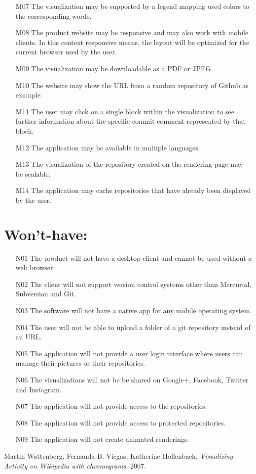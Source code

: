 \documentclass[12pt]{scrartcl}
\begin{document}
\begin{enumerate}
\item [M07] The visualization may be supported by a legend mapping used colors to the corresponding words.
\item [M08] The product website may be responsive and may also work with mobile clients. In this context responsive means, the layout will be optimized for the current browser used by the user.
\item [M09] The visualization may be downloadable as a PDF or JPEG.
\item [M10] The website may show the URL from a random repository of Github as example. 
\item [M11] The user may click on a single block within the visualization to see further information about the specific commit comment represented by that block.
\item [M12] The application may be available in multiple languages.
\item [M13] The visualization of the repository created on the rendering page may be scalable.
\item [M14] The application may cache repositories that have already been displayed by the user.
\end{enumerate}
\section{Won't-have:}
\begin{enumerate}
\item [N01] The product will not have a desktop client and cannot be used without a web browser.
\item [N02] The client will not support version control systems other than Mercurial, Subversion and Git.
\item [N03] The software will not have a native app for any mobile operating system.
\item [N04] The user will not be able to upload a folder of a git repository instead of an URL.
\item [N05] The application will not provide a user login interface where users can manage their pictures or their repositories.
\item [N06] The visualizations will not be be shared on Google+, Facebook, Twitter and Instagram.
\item [N07] The application will not provide access to the repositories.
\item [N08] The application will not provide access to protected repositories.
\item [N09] The application will not create animated renderings.
\end{enumerate}


\begin{thebibliography}{9}

  Martin Wattenberg, Fernanda B. Viegas, Katherine Hollenbach,  
  \emph{Visualizing Activity on Wikipedia with chromograms}.
  2007.

\end{thebibliography}
\end{document}
